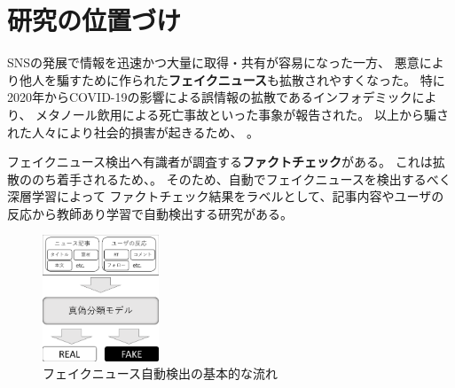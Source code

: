 
\section{研究の位置づけ}

SNSの発展で情報を迅速かつ大量に取得・共有が容易になった一方、
悪意により他人を騙すために作られた\textbf{フェイクニュース}も拡散されやすくなった。
特に2020年からCOVID-19の影響による誤情報の拡散であるインフォデミックにより、
メタノール飲用による死亡事故\cite{iraninfo}といった事象が報告された。
以上から騙された人々により社会的損害が起きるため、
\cite{snsinfo}。

フェイクニュース検出へ有識者が調査する\textbf{ファクトチェック}がある。
これは拡散ののち着手されるため、。
そのため、自動でフェイクニュースを検出するべく深層学習によって
ファクトチェック結果をラベルとして、記事内容やユーザの反応から教師あり学習で自動検出する研究がある\cite{Wang:2018:EEA:3219819.3219903}。


\setlength\intextsep{0pt}
\setlength\textfloatsep{0pt}
\begin{figure}
    \vspace{-5mm}
    \centering
    \includegraphics[width=0.31\textwidth]{figs/概念図.pdf}
    \vspace{-1cm} 
    \caption{フェイクニュース自動検出の基本的な流れ}
    \label{fig:objects}
\end{figure}

